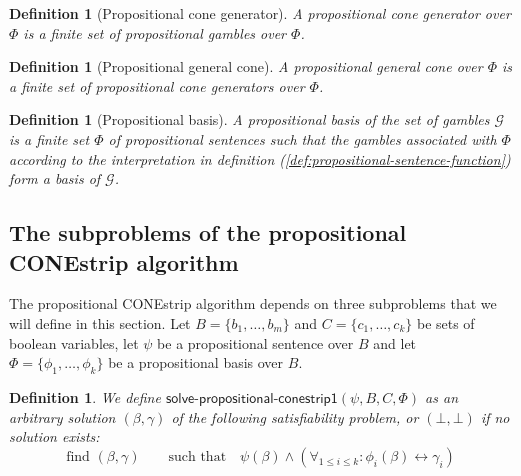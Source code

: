 \documentclass{article}
\theoremstyle{mytheorem}
\newtheorem{definition}[theorem]{Definition}
\newcommand{\func}[1]{\ensuremath{\textsf{#1}}} %
\newcommand{\set}[1]{\ensuremath{\{ #1 \} }} %
\begin{document}
\begin{definition}[Propositional cone generator]
A \emph{propositional cone generator} over $\Phi$ is a finite set of propositional gambles  over $\Phi$.
\end{definition}

\begin{definition}[Propositional general cone]
A \emph{propositional general cone} over $\Phi$ is a finite set of propositional cone generators over $\Phi$.
\end{definition}

\begin{definition}[Propositional basis]
A \emph{propositional basis} of the set of gambles $\mathcal{G}$ is a finite set $\Phi$ of propositional sentences such that the gambles associated with $\Phi$ according to the interpretation in definition (\ref{def:propositional-sentence-function}) form a basis of $\mathcal{G}$.
\end{definition}

\subsection{The subproblems of the propositional CONEstrip algorithm}
The propositional CONEstrip algorithm depends on three subproblems that we will define in this section. Let $B = \set{b_1, \ldots, b_m}$ and $C = \set{c_1, \ldots, c_k}$ be sets of boolean variables, let $\psi$ be a propositional sentence over $B$ and let $\Phi = \set{\phi_1, \ldots, \phi_k}$ be a propositional basis over $B$.

\begin{definition}
We define $\func{solve-propositional-conestrip1}(\psi, B, C, \Phi)$ as an arbitrary solution $(\beta, \gamma)$ of the following satisfiability problem, or $(\bot, \bot)$ if no solution exists:
\begin{equation} \label{eq:propositional_conestrip1}
    \text{find } (\beta, \gamma)
    \qquad \text{such that} \quad
         \psi(\beta) \land 
         \left( \forall_{1 \leq i \leq k}: \phi_i(\beta) \leftrightarrow \gamma_i \right)
\end{equation}
\end{definition}

\end{document}

